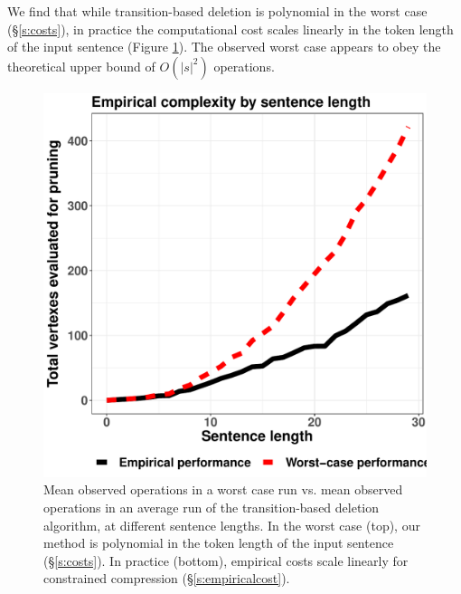 \documentclass[11pt,a4paper]{article}
\newcommand{\ahcomment}[1]{\textcolor{blue}{[#1 -AH]}}
\begin{document}
We find that while transition-based deletion is polynomial in the worst case (\S\ref{s:costs}), in practice the computational cost scales linearly in the token length of the input sentence (Figure \ref{f:example}). The observed worst case appears to obey the theoretical upper bound of $O(|s|^2)$ operations.

\begin{figure}[htb!]
\centering
\includegraphics[width=.4\textwidth]{observed.pdf}
\caption{Mean observed operations in a worst case run vs. mean observed operations in an average run of the transition-based deletion algorithm, at different sentence lengths. In the worst case (top), our method is polynomial in the token length of the input sentence (\S\ref{s:costs}). In practice (bottom), empirical costs scale linearly for constrained compression (\S\ref{s:empiricalcost}).}
\label{f:example}
\end{figure}



\end{document}
